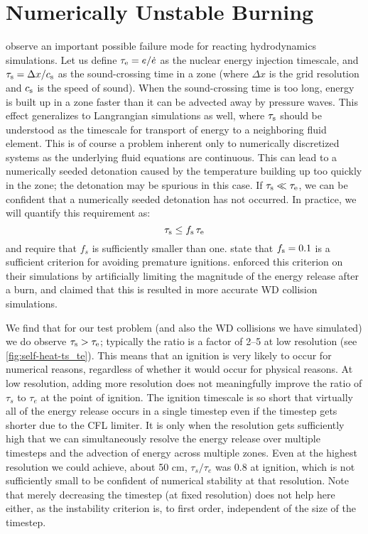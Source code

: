 \documentclass[twocolumn,numberedappendix,trackchanges]{../aastex62}
\begin{document}
\section{Numerically Unstable Burning}
\label{sec:unstable_burning}

\citet{kushnir:2013} observe an important possible failure mode
for reacting hydrodynamics simulations. Let us define $\tau_{\rm e} = e / \dot{e}$
as the nuclear energy injection timescale, and $\tau_{\rm s} = \Delta x / c_{\rm s}$
as the sound-crossing time in a zone (where $\Delta x$ is the grid
resolution and $c_{\rm s}$ is the speed of sound). When the sound-crossing
time is too long, energy is built up in a zone faster than it can be
advected away by pressure waves. This effect generalizes to
Langrangian simulations as well, where $\tau_{\rm s}$ should be understood
as the timescale for transport of energy to a neighboring fluid element.
This is of course a problem inherent 
only to numerically discretized systems as the underlying fluid equations
are continuous. This can lead to a numerically seeded detonation
caused by the temperature building up too quickly in the zone; the
detonation may be spurious in this case. If $\tau_{\rm s} \ll \tau_{\rm e}$,
we can be confident that a numerically seeded detonation has not
occurred. In practice, we will quantify this requirement as:
\begin{equation}
  \tau_{\rm s} \leq f_{\rm s}\, \tau_{\rm e} \label{eq:burning_limiter}
\end{equation}
and require that $f_{s}$ is sufficiently smaller than one.
\citet{kushnir:2013} state that $f_{\rm s} = 0.1$ is a sufficient
criterion for avoiding premature ignitions. \citeauthor{kushnir:2013}
enforced this criterion on their simulations by artificially limiting
the magnitude of the energy release after a burn, and claimed that
this is resulted in more accurate WD collision simulations.

We find that for our test problem (and also the WD collisions we have simulated)
we do observe $\tau_{\rm s} > \tau_{\rm e}$; typically the ratio is a factor of 2--5 at
low resolution (see \autoref{fig:self-heat-ts_te}). This means that an ignition is
very likely to occur for numerical reasons, regardless of whether it would occur for physical reasons.
At low resolution, adding more resolution does not meaningfully improve the ratio of
$\tau_s$ to $\tau_e$ at the point of ignition. The ignition timescale is so short
that virtually all of the energy release occurs in a single timestep even if the
timestep gets shorter due to the CFL limiter. It is only when the resolution gets
sufficiently high that we can simultaneously resolve the energy release over multiple
timesteps and the advection of energy across multiple zones. Even at the highest resolution
we could achieve, about 50 cm, $\tau_s / \tau_e$ was 0.8 at ignition, which is not
sufficiently small to be confident of numerical stability at that resolution. Note
that merely decreasing the timestep (at fixed resolution) does not help here either, as the
instability criterion is, to first order, independent of the size of the timestep.
\end{document}
